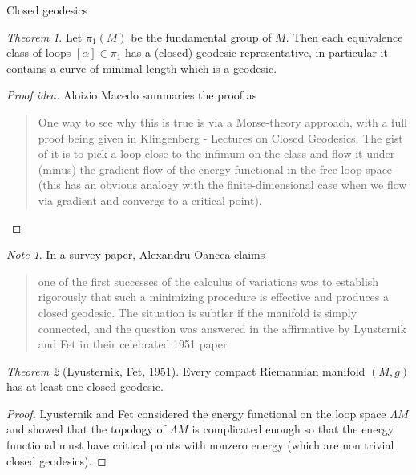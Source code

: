 \documentclass{article}
\theoremstyle{definition}
\theoremstyle{remark}
\newtheorem{remark}{Note}[section]
\newtheorem{theorem}{Theorem}[section]
\begin{document}
\begin{section}{Closed geodesics}

  \begin{theorem}
    Let $\pi_1(M)$ be the fundamental group of $M$. Then each equivalence class
    of loops $[\alpha] \in \pi_1$ has a (closed) geodesic representative, in
    particular it contains a curve of minimal length which is a geodesic.
  \end{theorem}
  \begin{proof}[Proof idea] %
    Aloizio Macedo summaries the proof as \begin{quote}
      One way to see why this is true is via a Morse-theory approach, with a
      full proof being given in Klingenberg - Lectures on Closed Geodesics. The
      gist of it is to pick a loop close to the infimum on the class and flow it
      under (minus) the gradient flow of the energy functional in the free loop
      space (this has an obvious analogy with the finite-dimensional case when
      we flow via gradient and converge to a critical point).
    \end{quote}
  \end{proof}

  \begin{remark}
  In a survey paper, Alexandru Oancea claims
    \begin{quote} %
      one of the first successes of the calculus of variations was to establish
      rigorously that such a minimizing procedure is effective and produces a
      closed geodesic. The situation is subtler if the manifold is simply
      connected, and the question was answered in the affirmative by Lyusternik
      and Fet in their celebrated 1951 paper
    \end{quote}
  \end{remark}

  \begin{theorem}[Lyusternik, Fet, 1951]
    Every compact Riemannian manifold $(M, g)$ has at least one closed geodesic.
  \end{theorem}
  \begin{proof} %
    Lyusternik and Fet considered the energy functional on the loop space $\Lambda M$ and
    showed that the topology of $\Lambda M$ is complicated enough so that the
    energy functional must have critical points with nonzero energy (which are
    non trivial closed geodesics).
  \end{proof}


\end{section}
\end{document}
